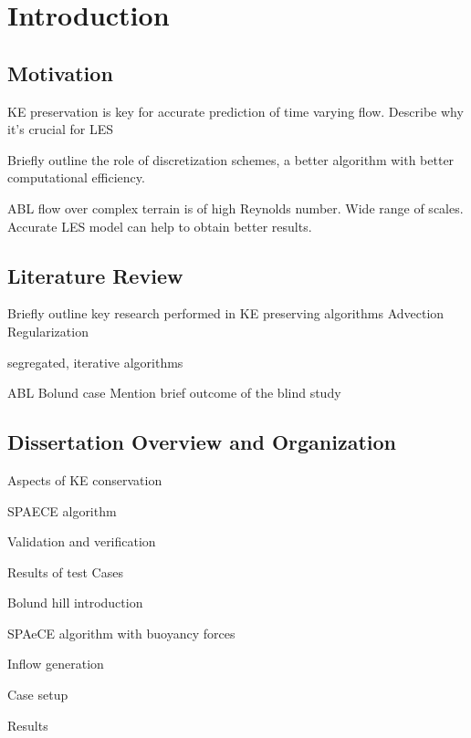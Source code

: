 
\chapter{Introduction}

\section{Motivation}

KE preservation is key for accurate prediction of time varying flow. 
Describe why it's crucial for LES

Briefly outline the role of discretization schemes, a better algorithm with better computational efficiency. 

ABL flow over complex terrain is of high Reynolds number. Wide range of scales. Accurate LES model can help to obtain better results.

\section{Literature Review}

Briefly outline key research performed in 
KE preserving algorithms
Advection Regularization

segregated, iterative algorithms

ABL  Bolund case
Mention brief outcome of the blind study

\section{Dissertation Overview and Organization}

Aspects of KE conservation

SPAECE algorithm

Validation and verification

Results of test Cases

Bolund hill introduction

SPAeCE algorithm with buoyancy forces

Inflow generation

Case setup

Results






